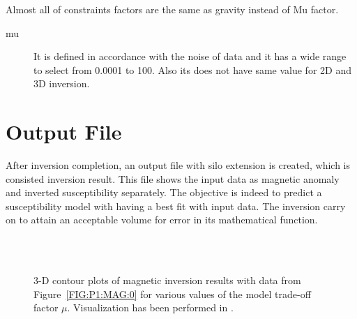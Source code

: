 Almost all of constraints factors are the same as gravity instead of Mu factor.\\

\begin{description} 	

\item[mu]
It is defined in accordance with the noise of data and it has a wide range to select from 0.0001 to 100. Also its does not have same value for 2D and 3D inversion.

\end{description}

\section{Output File}
After inversion completion, an output file with silo extension is created, which is consisted inversion result. This file shows the input data as magnetic anomaly and inverted susceptibility separately. The objective is indeed to  predict a susceptibility model with having a best fit with input data. The inversion carry on to attain an acceptable volume for error in its mathematical function. 





\begin{figure}
    \begin{center}
        \\ %
        \\ %
    \end{center}
    \caption{3-D contour plots of magnetic inversion results with data from
    Figure~\ref{FIG:P1:MAG:0} for various values of the model trade-off
    factor $\mu$. Visualization has been performed in \VisIt.
    }
    \label{FIG:P1:MAG:10}
\end{figure}

